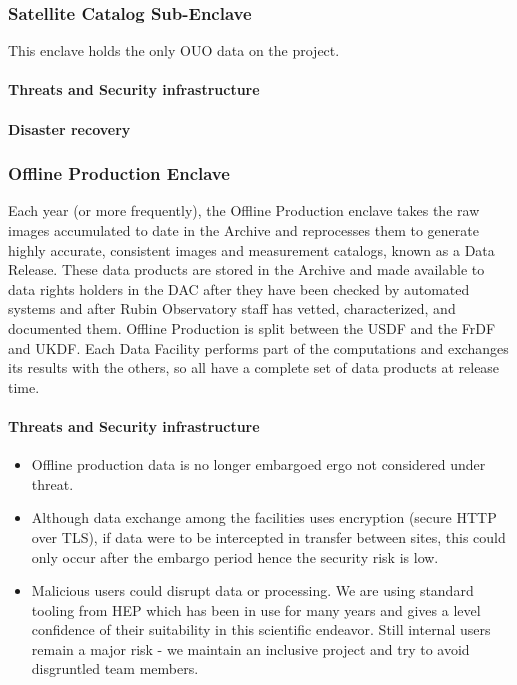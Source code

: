 \subsubsection{Satellite Catalog Sub-\gls{Enclave}} \label{sec:satcat}
This enclave holds the only \gls{OUO} data on the project.
\paragraph{ Threats and Security infrastructure}
\paragraph{Disaster recovery}

\subsubsection{ Offline Production  \gls{Enclave}}
Each year (or more frequently), the Offline Production enclave takes the raw images accumulated to date in the Archive and reprocesses them to generate highly accurate, consistent images and measurement catalogs, known as a Data Release. These data products are stored in the Archive and made available to data rights holders in the DAC after they have been checked by automated systems and after Rubin Observatory staff has vetted, characterized, and documented them. Offline Production is split between the USDF and the \gls{FrDF} and UKDF. Each Data Facility performs part of the computations and exchanges its results with the others, so all have a complete set of data products at release time.


\paragraph{ Threats and Security infrastructure}
\begin{itemize}
\item Offline production data is no longer embargoed ergo not considered under threat.
\item Although data exchange among the facilities uses encryption (secure HTTP over TLS), if data were to be intercepted in transfer between sites, this could only occur after the embargo period hence the security risk is low.
\item Malicious users could disrupt data or processing.
We are using standard tooling from \gls{HEP} which has been in use for many years and gives a level confidence of their suitability in this scientific endeavor.
Still internal users remain a major risk - we maintain an inclusive project and try to avoid disgruntled team members.
\end{itemize}
